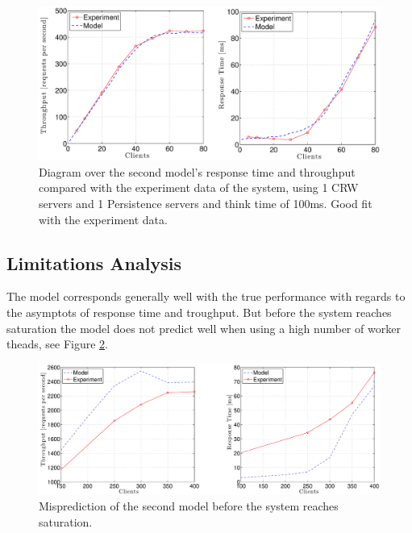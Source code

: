 \documentclass[a4paper, 11pt]{article}
\begin{document}
	\FloatBarrier
	\begin{figure}[cht!]
		\centering
			\includegraphics[width=1\linewidth,keepaspectratio]{secondRealAndModel1Thread}
		\caption{Diagram over the second model's response time and throughput compared with the experiment data of the system, using 1 CRW servers and 1 Persistence servers and think time of 100ms. Good fit with the experiment data.}
		\label{fig:secondmodelResults-1-th}
	\end{figure}
	\FloatBarrier

	\subsection{Limitations Analysis}
	The model corresponds generally well with the true performance with regards to the asymptots of response time and troughput. But before the system reaches saturation the model does not predict well when using a high number of worker theads, see Figure \ref{fig:secondmodelResults-error}. 

	\FloatBarrier
	\begin{figure}[cht!]
		\centering
			\includegraphics[width=1\linewidth,keepaspectratio]{secondRealAndModelError}
		\caption{Misprediction of the second model before the system reaches saturation.}
		\label{fig:secondmodelResults-error}
	\end{figure}
	\FloatBarrier

	
	
\end{document}
